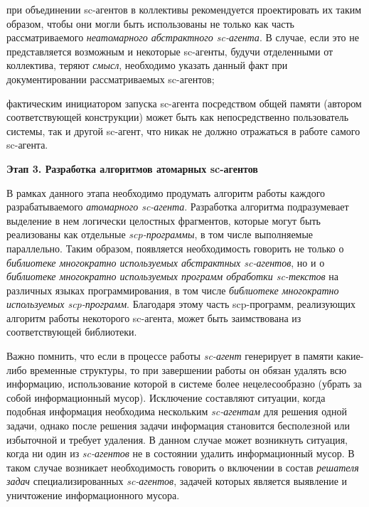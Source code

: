\begin{textitemize}
\item при объединении sc-агентов в коллективы рекомендуется проектировать их таким образом, чтобы они могли быть использованы не только как часть рассматриваемого \textit{неатомарного абстрактного sc-агента}. В случае, если это не представляется возможным и некоторые sc-агенты, будучи отделенными от коллектива, теряют \textit{смысл}, необходимо указать данный факт при документировании рассматриваемых sc-агентов;
\item фактическим инициатором запуска sc-агента посредством общей памяти (автором соответствующей конструкции) может быть как непосредственно пользователь системы, так и другой sc-агент, что никак не должно отражаться в работе самого sc-агента.
\end{textitemize}

\textbf{Этап 3. Разработка алгоритмов атомарных sc-агентов}

В рамках данного этапа необходимо продумать алгоритм работы каждого разрабатываемого \textit{атомарного sc-агента}. Разработка алгоритма подразумевает выделение в нем логически целостных фрагментов, которые могут быть реализованы как отдельные \textit{scp-программы}, в том числе выполняемые параллельно. Таким образом, появляется необходимость говорить не только о \textit{библиотеке многократно используемых абстрактных sc-агентов}, но и о \textit{библиотеке многократно используемых программ обработки sc-текстов} на различных языках программирования, в том числе \textit{библиотеке многократно используемых scp-программ}. Благодаря этому часть scp-программ, реализующих алгоритм работы некоторого sc-агента, может быть заимствована из соответствующей библиотеки.

Важно помнить, что если в процессе работы \textit{sc-агент} генерирует в памяти какие-либо временные структуры, то при завершении работы он обязан удалять всю информацию, использование которой в системе более нецелесообразно (убрать за собой информационный мусор). Исключение составляют ситуации, когда подобная информация необходима нескольким \textit{sc-агентам} для решения одной задачи, однако после решения задачи информация становится бесполезной или избыточной и требует удаления. В данном случае может возникнуть ситуация, когда ни один из \textit{sc-агентов} не в состоянии удалить информационный мусор. В таком случае возникает необходимость говорить о включении в состав \textit{решателя задач} специализированных \textit{sc-агентов}, задачей которых является выявление и уничтожение информационного мусора.

